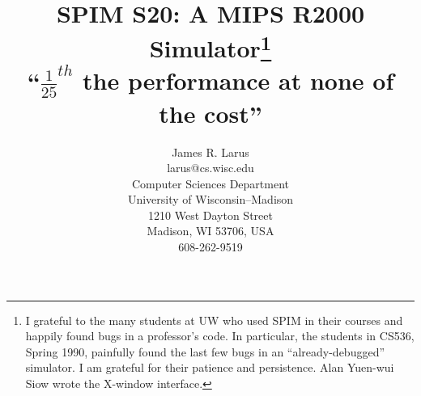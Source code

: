 %
%
%
%
%
%
%


%
%



\usepackage{psfig}

%


\setlength{\oddsidemargin}{0.1 true in}
\setlength{\evensidemargin}{0.15 true in}
\setlength{\marginparwidth}{1 true in}
\setlength{\oddsidemargin}{0.125 true in}
\setlength{\evensidemargin}{0.125 true in}
\setlength{\marginparwidth}{0.75 true in}
\setlength{\topmargin}{-.50 true in}
\setlength{\textheight}{9.0 true in}
\setlength{\textwidth}{6.30 true in}




\title{SPIM S20: A MIPS R2000 Simulator\thanks
{I grateful to the many students at UW who used SPIM in their courses
and happily found bugs in a professor's code.  In particular, the
students in CS536, Spring 1990, painfully found the last few bugs in
an ``already-debugged'' simulator.  I am grateful for their patience
and persistence.  Alan Yuen-wui Siow wrote the X-window interface.}
\\
{\small ``$\frac{1}{25}^{th}$ the performance at none of 	the
cost''}}

\author{{\normalsize James R. Larus} \\
	{\normalsize larus@cs.wisc.edu} \\
	{\normalsize Computer Sciences Department} \\
	{\normalsize University of Wisconsin--Madison} \\
	{\normalsize 1210 West Dayton Street} \\
	{\normalsize Madison, WI 53706, USA} \\
	{\normalsize 608-262-9519}}

